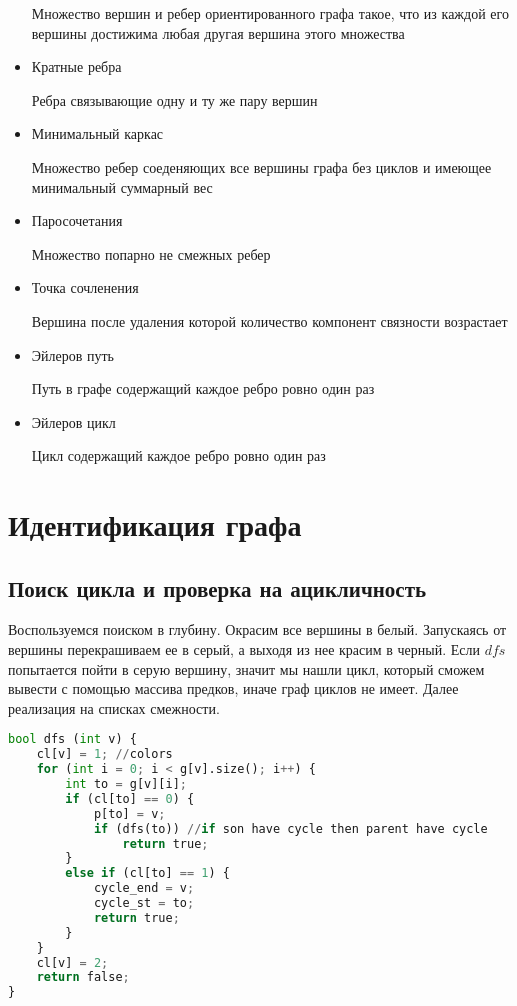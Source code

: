 \begin{itemize}
    \begin{mydef}
        Множество вершин и ребер ориентированного графа такое, что из каждой его           вершины достижима любая другая вершина этого множества
    \end{mydef}
\item     
    Кратные ребра
    \begin{mydef}
        Ребра связывающие одну и ту же пару вершин
    \end{mydef}
\item     
    Минимальный каркас
    \begin{mydef}
        Множество ребер соеденяющих все вершины графа без циклов и имеющее               минимальный суммарный вес
    \end{mydef}
\item     
    Паросочетания
    \begin{mydef}
        Множество попарно не смежных ребер
    \end{mydef}
\item     
    Точка сочленения
    \begin{mydef}
        Вершина после удаления которой количество компонент связности возрастает
    \end{mydef}
\item     
    Эйлеров путь
    \begin{mydef}
        Путь в графе содержащий каждое ребро ровно один раз
    \end{mydef}
\item     
    Эйлеров цикл
    \begin{mydef}
        Цикл содержащий каждое ребро ровно один раз
    \end{mydef}
\end{itemize}
\section{Идентификация графа}
\subsection{Поиск цикла и проверка на ацикличность}
Воспользуемся поиском в глубину. Окрасим все вершины в белый. Запускаясь от вершины перекрашиваем ее в серый, а выходя из нее красим в черный. Если ${dfs}$ попытается пойти в серую вершину, значит мы нашли цикл, который сможем вывести с помощью массива предков, иначе граф циклов не имеет. Далее реализация на списках смежности.
\begin{lstlisting}[language=Python]
bool dfs (int v) {
	cl[v] = 1; //colors
	for (int i = 0; i < g[v].size(); i++) {
		int to = g[v][i];
		if (cl[to] == 0) {
			p[to] = v; 
			if (dfs(to)) //if son have cycle then parent have cycle
			    return true;
		}
		else if (cl[to] == 1) {
			cycle_end = v;
			cycle_st = to;
			return true;
		}
	}
	cl[v] = 2;
	return false;
}
\end{lstlisting}
